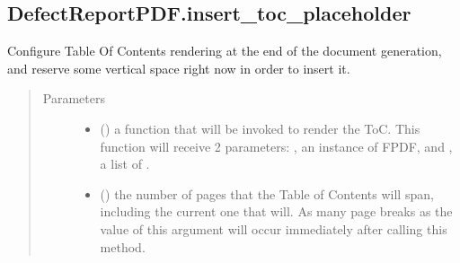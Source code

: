 \documentclass[letterpaper,10pt,english]{sphinxmanual}
\begin{document}
\begin{fulllineitems}
\begin{fulllineitems}
\begin{quote}
\begin{description}
\begin{itemize}
\end{itemize}

\end{description}\end{quote}

\end{fulllineitems}



\subsection{DefectReportPDF.insert\_toc\_placeholder}
\label{\detokenize{generated/quality_assessment.quality_pdf_report.DefectReportPDF.insert_toc_placeholder:defectreportpdf-insert-toc-placeholder}}\label{\detokenize{generated/quality_assessment.quality_pdf_report.DefectReportPDF.insert_toc_placeholder::doc}}

\begin{fulllineitems}
\label{\detokenize{generated/quality_assessment.quality_pdf_report.DefectReportPDF.insert_toc_placeholder:quality_assessment.quality_pdf_report.DefectReportPDF.insert_toc_placeholder}}
\sphinxAtStartPar
Configure Table Of Contents rendering at the end of the document generation,
and reserve some vertical space right now in order to insert it.
\begin{quote}\begin{description}
\item[{Parameters}] \leavevmode\begin{itemize}
\item {} 
\sphinxAtStartPar
{} () \textendash{} a function that will be invoked to render the ToC.
This function will receive 2 parameters: , an instance of FPDF, and ,
a list of .

\item {} 
\sphinxAtStartPar
{} () \textendash{} the number of pages that the Table of Contents will span,
including the current one that will. As many page breaks as the value of this argument
will occur immediately after calling this method.


\end{itemize}
\end{description}
\end{quote}
\end{fulllineitems}
\end{fulllineitems}
\end{document}
